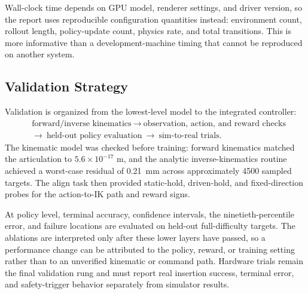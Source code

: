 Wall-clock time depends on GPU model, renderer settings, and driver version, so the report uses reproducible configuration quantities instead: environment count, rollout length, policy-update count, physics rate, and total transitions. This is more informative than a development-machine timing that cannot be reproduced on another system.

\subsection{Validation Strategy}\label{rl:sec:rl-valid}

Validation is organized from the lowest-level model to the integrated controller:
\begin{equation*}
\begin{aligned}
&\text{forward/inverse kinematics}\ \longrightarrow\ \text{observation, action, and reward checks}\\
&\longrightarrow\ \text{held-out policy evaluation}\ \longrightarrow\ \text{sim-to-real trials}.
\end{aligned}
\end{equation*}
The kinematic model was checked before training: forward kinematics matched the articulation to $5.6\times10^{-17}$ m, and the analytic inverse-kinematics routine achieved a worst-case residual of \SI{0.21}{\milli\meter} across approximately \num{4500} sampled targets. The align task then provided static-hold, driven-hold, and fixed-direction probes for the action-to-IK path and reward signs.

At policy level, terminal accuracy, confidence intervals, the ninetieth-percentile error, and failure locations are evaluated on held-out full-difficulty targets. The ablations are interpreted only after these lower layers have passed, so a performance change can be attributed to the policy, reward, or training setting rather than to an unverified kinematic or command path. Hardware trials remain the final validation rung and must report real insertion success, terminal error, and safety-trigger behavior separately from simulator results.


\endgroup
